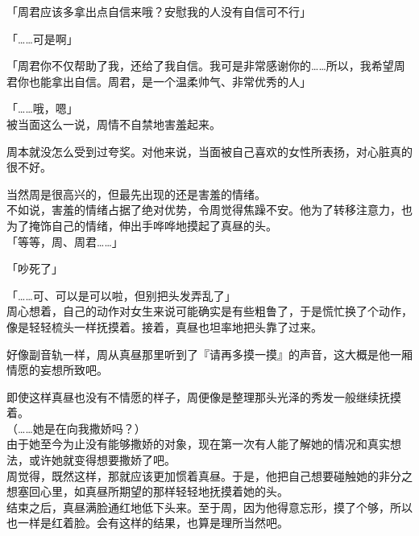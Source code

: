 「周君应该多拿出点自信来哦？安慰我的人没有自信可不行」%

「……可是啊」

「周君你不仅帮助了我，还给了我自信。我可是非常感谢你的……所以，我希望周君你也能拿出自信。周君，是一个温柔帅气、非常优秀的人」

「……哦，嗯」\\

被当面这么一说，周情不自禁地害羞起来。

周本就没怎么受到过夸奖。对他来说，当面被自己喜欢的女性所表扬，对心脏真的很不好。

当然周是很高兴的，但最先出现的还是害羞的情绪。\\

不如说，害羞的情绪占据了绝对优势，令周觉得焦躁不安。他为了转移注意力，也为了掩饰自己的情绪，伸出手哗哗地摸起了真昼的头。\\

「等等，周、周君……」

「吵死了」

「……可、可以是可以啦，但别把头发弄乱了」\\

周心想着，自己的动作对女生来说可能确实是有些粗鲁了，于是慌忙换了个动作，像是轻轻梳头一样抚摸着。接着，真昼也坦率地把头靠了过来。

好像副音轨一样，周从真昼那里听到了『请再多摸一摸』的声音，这大概是他一厢情愿的妄想所致吧。

即使这样真昼也没有不情愿的样子，周便像是整理那头光泽的秀发一般继续抚摸着。\\

（……她是在向我撒娇吗？）\\

由于她至今为止没有能够撒娇的对象，现在第一次有人能了解她的情况和真实想法，或许她就变得想要撒娇了吧。\\

周觉得，既然这样，那就应该更加惯着真昼。于是，他把自己想要碰触她的非分之想塞回心里，如真昼所期望的那样轻轻地抚摸着她的头。\\

结束之后，真昼满脸通红地低下头来。至于周，因为他得意忘形，摸了个够，所以也一样是红着脸。会有这样的结果，也算是理所当然吧。
